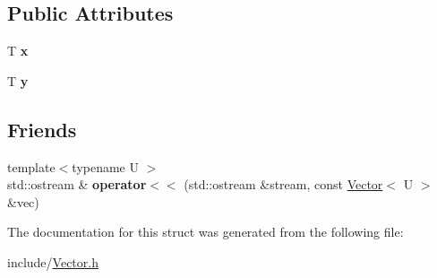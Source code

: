 \subsection*{Public Attributes}
\begin{DoxyCompactItemize}
\item 
\mbox{\label{structmonsterbattle_1_1Vector_ad64510a6e83b61deb49654d591306ee9}} 
T {\bfseries x}
\item 
\mbox{\label{structmonsterbattle_1_1Vector_acf4cca328a02b3be6c618eabf0145424}} 
T {\bfseries y}
\end{DoxyCompactItemize}
\subsection*{Friends}
\begin{DoxyCompactItemize}
\item 
\mbox{\label{structmonsterbattle_1_1Vector_a6467f38aa226485123919315be66e8a5}} 
{\footnotesize template$<$typename U $>$ }\\std\+::ostream \& {\bfseries operator$<$$<$} (std\+::ostream \&stream, const \hyperlink{structmonsterbattle_1_1Vector}{Vector}$<$ U $>$ \&vec)
\end{DoxyCompactItemize}


The documentation for this struct was generated from the following file\+:\begin{DoxyCompactItemize}
\item 
include/\hyperlink{Vector_8h}{Vector.\+h}\end{DoxyCompactItemize}
